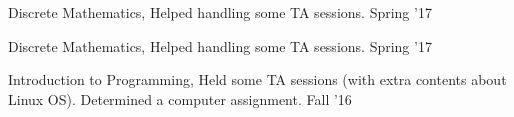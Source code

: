 \begin{cvtas}
  \cvta
    {Discrete Mathematics, } %
    {Helped handling some TA sessions.} %
    {Spring '17} %
    {} %

  \cvta
    {Discrete Mathematics, } %
    {Helped handling some TA sessions.} %
    {Spring '17} %
    {} %

  \cvta
    {Introduction to Programming, } %
    {Held some TA sessions (with extra contents about Linux OS). Determined a computer assignment.} %
    {Fall '16} %
    {} %


\end{cvtas}




